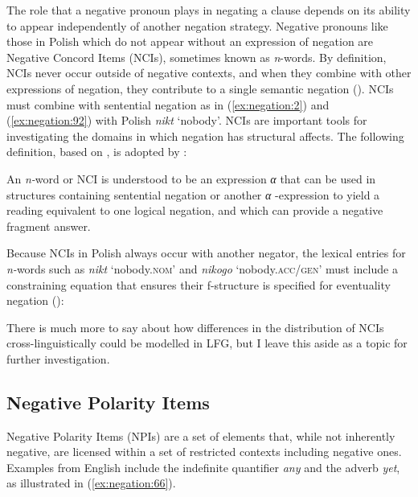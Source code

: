 \documentclass[output=paper,hidelinks]{langscibook}
\begin{document}
The role that a negative pronoun plays in negating a clause depends on its ability to appear independently of another negation strategy. Negative pronouns like those in Polish which do not appear without an expression of negation are Negative Concord Items (NCIs), sometimes known as \emph{n}-words. By definition, NCIs never occur outside of negative contexts, and when they combine with other expressions of negation, they contribute to a single semantic negation (\cite{Labov1972}). NCIs must combine with sentential negation as in (\ref{ex:negation:2}) and (\ref{ex:negation:92}) with Polish \emph{nikt} `nobody'. NCIs are important tools for investigating the domains in which negation has structural affects. The following definition, based on \citet [328] {Giannakidou:06}, is adopted by \citet [150] {camilleri-sadler:2017}:

\ea
\label{ex:negation:74} 
An \emph{n-}word or NCI is understood to be an expression \emph{α} that can be used in structures containing sentential negation or another \emph{α} -expression to yield a reading equivalent to one logical negation, and which can provide a negative fragment answer.
\z

Because NCIs in Polish always occur with another negator, the lexical entries for \emph{n-}words such as \emph{nikt} ‘nobody.\textsc{nom}’ and \emph{nikogo} ‘nobody.\textsc{acc/gen}’ must include a constraining equation that ensures their f-structure is specified for eventuality negation (\citealt [331]{przepiorkowski2015two}):  

\ea\label{ex:negation:450} 
 \z

\ea\label{ex:negation:451} 
 \z
 
There is much more to say about how differences in the distribution of NCIs cross-linguistically could be modelled in LFG, but I leave this aside as a topic for further investigation.

\subsection{Negative Polarity Items}
\label{sec:negation:npis}

Negative Polarity Items (NPIs) are a set of elements that, while not inherently negative, are licensed within a set of restricted contexts including negative ones. Examples from English include the indefinite quantifier \emph{any} and the adverb \emph{yet}, as illustrated in (\ref{ex:negation:66}).
\end{document}
